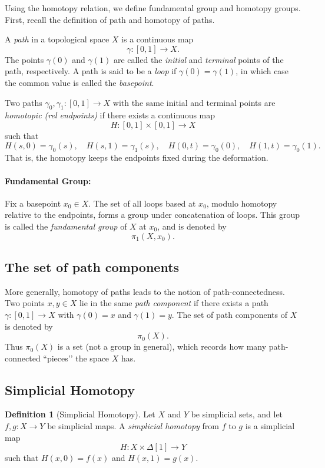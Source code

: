 \documentclass[11pt]{article}
\theoremstyle{definition}
\newtheorem{definition}{Definition}[section]
\theoremstyle{plain}
\begin{document}
Using the homotopy relation, we define fundamental group and homotopy groups.
First, recall the definition of path and homotopy of paths.






A \emph{path} in a topological space $X$ is a continuous map
\[
    \gamma : [0,1] \to X.
\]
The points $\gamma(0)$ and $\gamma(1)$ are called the \emph{initial} and \emph{terminal} points of the path, respectively.
A path is said to be a \emph{loop} if $\gamma(0) = \gamma(1)$, in which case the common value is called the \emph{basepoint}.

Two paths $\gamma_0, \gamma_1 : [0,1] \to X$ with the same initial and terminal points are \emph{homotopic (rel endpoints)} if there exists a continuous map
\[
    H : [0,1] \times [0,1] \to X
\]
such that
\[
    H(s,0) = \gamma_0(s),
    \quad H(s,1) = \gamma_1(s),
    \quad H(0,t) = \gamma_0(0),
    \quad H(1,t) = \gamma_0(1).
\]
That is, the homotopy keeps the endpoints fixed during the deformation.

\paragraph{Fundamental Group:}

Fix a basepoint $x_0 \in X$. The set of all loops based at $x_0$, modulo homotopy relative to the endpoints, forms a group under concatenation of loops.
This group is called the \emph{fundamental group} of $X$ at $x_0$, and is denoted by
\[
    \pi_1(X, x_0).
\]

\subsection{The set of path components}

More generally, homotopy of paths leads to the notion of path-connectedness. Two points $x,y \in X$ lie in the same \emph{path component} if there exists a path $\gamma : [0,1] \to X$ with $\gamma(0) = x$ and $\gamma(1) = y$.
The set of path components of $X$ is denoted by
\[
    \pi_0(X).
\]
Thus $\pi_0(X)$ is a set (not a group in general), which records how many path-connected “pieces’’ the space $X$ has.


\subsection{Simplicial Homotopy}

\begin{definition}[Simplicial Homotopy]
    Let $X$ and $Y$ be simplicial sets, and let $f, g : X \to Y$ be simplicial maps. A \emph{simplicial homotopy} from $f$ to $g$ is a simplicial map
    \[
        H : X \times \Delta[1] \to Y
    \]
    such that $H(x, 0) = f(x)$ and $H(x, 1) = g(x)$.
\end{definition}
\end{document}
